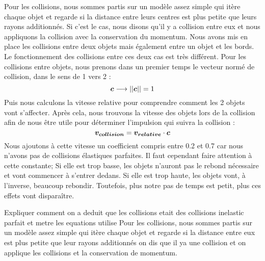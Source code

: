     Pour les collisions, nous sommes partis sur un modèle assez simple qui itère chaque objet et regarde si la distance entre leurs centres est plus petite que leurs rayons additionnés. Si c'est le cas, nous disons qu'il y a collision entre eux et nous appliquons la collision avec la conservation du momentum. Nous avons mis en place les collisions entre deux objets mais également entre un objet et les bords. Le fonctionnement des collisions entre ces deux cas est très différent. Pour les collisions entre objets, nous prenons dans un premier temps le vecteur normé de collision, dans le sens de 1 vers 2 :
    \begin{equation}
        \vb*{c}\longrightarrow ||\vb*{c}|| = 1
    \end{equation}
    Puis nous calculons la vitesse relative pour comprendre comment les 2 objets vont s'affecter. Après cela, nous trouvons la vitesse des objets lors de la collision afin de nous être utile pour déterminer l'impulsion qui suivra la collision :
    \begin{equation}
        \vb*{v_{collision}}=\vb*{v_{relative}}\cdot\vb*{c}
    \end{equation}
    Nous ajoutons à cette vitesse un coefficient compris entre 0.2 et 0.7 car nous n'avons pas de collisions élastiques parfaites. Il faut cependant faire attention à cette constante; Si elle est trop basse, les objets n'auront pas le rebond nécessaire et vont commencer à s'entrer dedans. Si elle est trop haute, les objets vont, à l'inverse, beaucoup rebondir. Toutefois, plus notre pas de temps est petit, plus ces effets vont disparaître.


    Expliquer comment on a deduit que les collisions etait des collisions inelastic parfait et metre les equations utilise
    Pour les collisions, nous sommes partis sur un modèle assez simple qui itère chaque objet et regarde si la distance entre eux est plus petite que leur rayons additionnés on dis que il ya une collision et on applique les collisions et la conservation de momentum.


